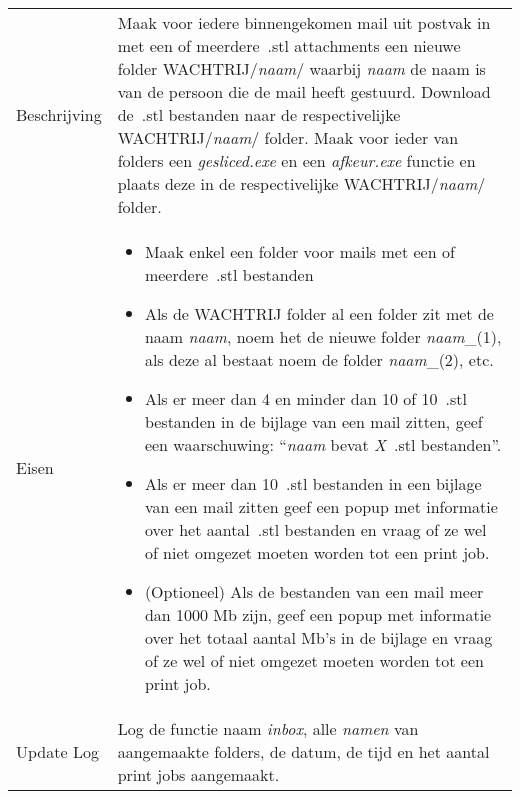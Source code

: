 \documentclass{article}
\newcommand{\quotes}[1]{``#1''}
\begin{document}
\begin{table}[H]
    \centering
    \begin{tabular}%
    {>{\raggedright\arraybackslash}p{}%
    |>{\raggedright\arraybackslash}p{}}
    \rowcolor{myblue}\multicolumn{2}{c}{\rule{0pt}{13pt}Functie: {\Large \textit{inbox.exe}}}\\\hline
    Beschrijving & 
    Maak voor iedere binnengekomen mail uit postvak in met een of meerdere~.stl attachments een nieuwe folder WACHTRIJ/\textit{naam}/ waarbij \textit{naam} de naam is van de persoon die de mail heeft gestuurd. Download de~.stl bestanden naar de respectivelijke WACHTRIJ/\textit{naam}/ folder. Maak voor ieder van folders een \textit{gesliced.exe} en een \textit{afkeur.exe} functie en plaats deze in de respectivelijke WACHTRIJ/\textit{naam}/ folder.\\
  Eisen & 
\begin{itemize} 
\item Maak enkel een folder voor mails met een of meerdere~.stl bestanden
\item Als de WACHTRIJ folder al een folder zit met de naam \textit{naam}, noem het de nieuwe folder \textit{naam}\_(1), als deze al bestaat noem de folder \textit{naam}\_(2), etc.
\item Als er meer dan 4 en minder dan 10 of 10~.stl bestanden in de bijlage van een mail zitten, geef een waarschuwing: \quotes{\textit{naam} bevat \textit{X}~.stl bestanden}.
\item Als er meer dan 10~.stl bestanden in een bijlage van een mail zitten geef een popup met informatie over het aantal~.stl bestanden en vraag of ze wel of niet omgezet moeten worden tot een print job. 
\item (Optioneel) Als de bestanden van een mail meer dan 1000 Mb zijn, geef een popup met informatie over het totaal aantal Mb's in de bijlage en vraag of ze wel of niet omgezet moeten worden tot een print job. 
\end{itemize} \\
  Update Log& Log de functie naam \textit{inbox}, alle \textit{namen} van aangemaakte folders, de datum, de tijd en het aantal print jobs aangemaakt.\\
    \end{tabular}
\end{table}
\end{document}

